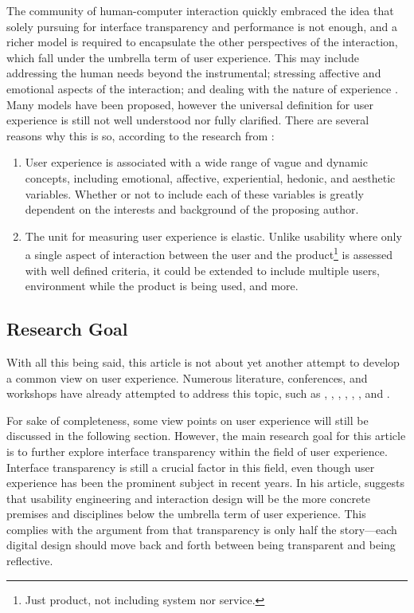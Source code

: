 \documentclass{acm_proc_article-sp}
\begin{document}
The community of human-computer interaction quickly embraced the
idea that solely pursuing for interface transparency and performance
is not enough, and a richer model is required to encapsulate the other
perspectives of the interaction, which fall under the umbrella term of
user experience. This may include addressing the human needs beyond
the instrumental; stressing affective and emotional aspects of the
interaction; and dealing with the nature of experience
\citep{ux:hassenzahl}. Many models have been proposed, however the
universal definition for user experience is still not well understood
nor fully clarified. There are several reasons why this is so,
according to the research from \citet{ux:law}:
\begin{enumerate}
  \item User experience is associated with a wide range of vague and
    dynamic concepts, including emotional, affective, experiential,
    hedonic, and aesthetic variables. Whether or not to include each
    of these variables is greatly dependent on the interests and
    background of the proposing author.
  \item The unit for measuring user experience is elastic. Unlike
    usability where only a single aspect of interaction between the
    user and the product\footnote{Just product, not including system
      nor service.} is assessed with well defined criteria, it could
    be extended to include multiple users, environment while the
    product is being used, and more.
\end{enumerate}

\subsection{Research Goal}
With all this being said, this article is not about yet another
attempt to develop a common view on user experience. Numerous
literature, conferences, and workshops have already attempted to
address this topic, such as \citet{early:forlizzi},
\citet{emotional:norman}, \citet{experience:forlizzi},
\citet{action:dourish}, \citet{ux:hassenzahl},
\citet{experience:desmet}, and \citet{ux:law}.

For sake of completeness, some view points on user experience will
still be discussed in the following section. However, the main
research goal for this article is to further explore interface
transparency within the field of user experience. Interface
transparency is still a crucial factor in this field, even though user
experience has been the prominent subject in recent years. In his
article, \citet{future:memmel} suggests that usability engineering and
interaction design will be the more concrete premises and disciplines
below the umbrella term of user experience. This complies with the
argument from \citet{windows:bolter} that transparency is only half
the story---each digital design should move back and forth between
being transparent and being reflective.
\end{document}
